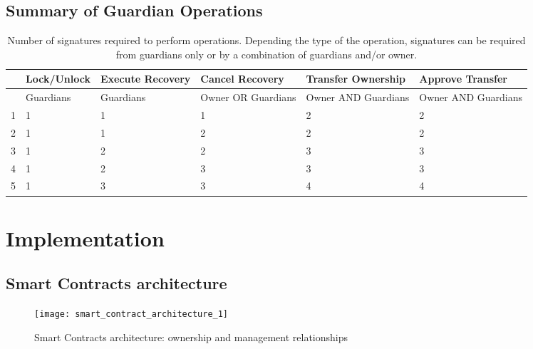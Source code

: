 \documentclass[12pt]{article}
\begin{document}
\subsection{Summary of Guardian Operations}
\begin{table}[ht]
    \begin{tabular}{ |c|m{6em}|m{6em}|m{6em}|m{6em}|m{6em}| }
     \hline
       & Lock/Unlock & Execute \newline Recovery & Cancel  \newline Recovery & Transfer Ownership & Approve Transfer \\
     \hline \hline
       & Guardians & Guardians & Owner OR Guardians & Owner AND Guardians & Owner AND Guardians \\
     \hline
     1 & 1 & 1 & 1 & 2 & 2 \\
     2 & 1 & 1 & 2 & 2 & 2 \\
     3 & 1 & 2 & 2 & 3 & 3 \\
     4 & 1 & 2 & 3 & 3 & 3 \\
     5 & 1 & 3 & 3 & 4 & 4 \\
     \hline

    \end{tabular}
    \caption{Number of signatures required to perform operations. Depending the type of the operation, signatures can be required from guardians only or by a combination of guardians and/or owner.}
\end{table}

\section{Implementation}

\subsection{Smart Contracts architecture}

\begin{figure}[h]
    \label{fig:sc-arch-1}
    \texttt{[image: smart\_contract\_architecture\_1]}
    \caption{Smart Contracts architecture: ownership and management relationships}
\end{figure}
\end{document}
